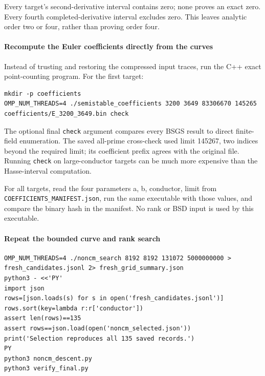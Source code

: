 \documentclass[11pt]{article}
\begin{document}
Every target's second-derivative interval contains zero; none proves an exact zero. Every fourth completed-derivative interval excludes zero. This leaves analytic order two or four, rather than proving order four.

\paragraph{Recompute the Euler coefficients directly from the curves}

Instead of trusting and restoring the compressed input traces, run the C++ exact point-counting program. For the first target:

\begin{Verbatim}[breaklines=true,breakanywhere=true,fontsize=\small]
mkdir -p coefficients
OMP_NUM_THREADS=4 ./semistable_coefficients 3200 3649 83306670 145265 coefficients/E_3200_3649.bin check
\end{Verbatim}

The optional final \nolinkurl{check} argument compares every BSGS result to direct finite-field enumeration. The saved all-prime cross-check used limit 145267, two indices beyond the required limit; its coefficient prefix agrees with the original file. Running \nolinkurl{check} on large-conductor targets can be much more expensive than the Hasse-interval computation.

For all targets, read the four parameters a, b, conductor, limit from \nolinkurl{COEFFICIENTS_MANIFEST.json}, run the same executable with those values, and compare the binary hash in the manifest. No rank or BSD input is used by this executable.

\paragraph{Repeat the bounded curve and rank search}

\begin{Verbatim}[breaklines=true,breakanywhere=true,fontsize=\small]
OMP_NUM_THREADS=4 ./noncm_search 8192 8192 131072 5000000000 > fresh_candidates.jsonl 2> fresh_grid_summary.json
python3 - <<'PY'
import json
rows=[json.loads(s) for s in open('fresh_candidates.jsonl')]
rows.sort(key=lambda r:r['conductor'])
assert len(rows)==135
assert rows==json.load(open('noncm_selected.json'))
print('Selection reproduces all 135 saved records.')
PY
python3 noncm_descent.py
python3 verify_final.py
\end{Verbatim}
\end{document}

